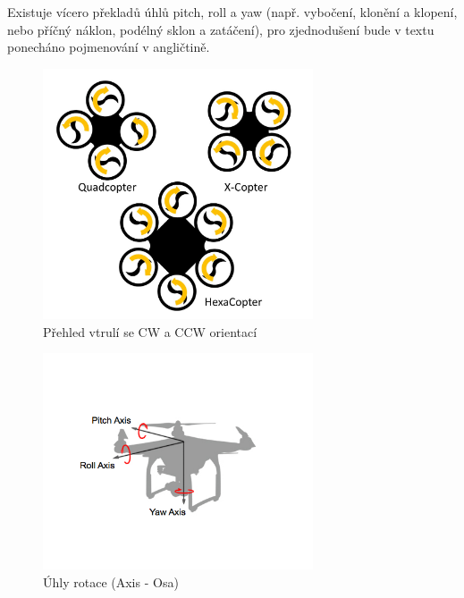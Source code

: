 Existuje vícero překladů úhlů pitch, roll a yaw (např. vybočení, klonění a  klopení, nebo příčný náklon, podélný sklon a zatáčení), pro zjednodušení bude v textu ponecháno pojmenování v angličtině.\\
\begin{figure}[h]
	\centering
	\includegraphics[width=8cm]{pictures/dronrot.png}
	\caption{Přehled vtrulí se CW a CCW orientací}
\end{figure} 
\begin{figure}[h]
	\centering
	\includegraphics[width=8cm]{pictures/rotangle.png}
	\caption{Úhly rotace (Axis - Osa)}

\end{figure} 
